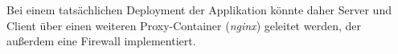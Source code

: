 Bei einem tatsächlichen Deployment der Applikation könnte daher Server und Client über einen weiteren Proxy-Container (\textit{nginx}) geleitet werden, der außerdem eine Firewall implementiert.
\par
\clearpage
